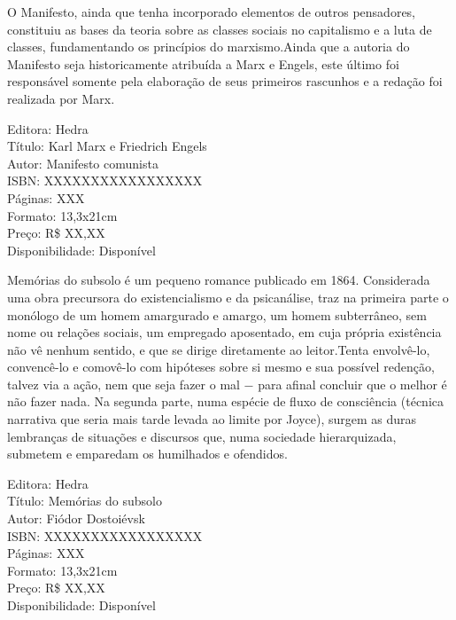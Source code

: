 O Manifesto, ainda que tenha incorporado elementos de outros pensadores, constituiu as bases da teoria sobre as classes sociais no capitalismo e a luta de classes, fundamentando os princípios do marxismo.Ainda que a autoria do Manifesto seja historicamente atribuída a Marx e Engels, este último foi responsável somente pela elaboração de seus primeiros rascunhos e a redação foi realizada por Marx.

\begin{ficha}
Editora: Hedra\\
Título: Karl Marx e Friedrich Engels\\
Autor: Manifesto comunista\\ 
ISBN: XXXXXXXXXXXXXXXXX\\
Páginas: XXX\\
Formato: 13,3x21cm\\
Preço: R\$ XX,XX\\
Disponibilidade: Disponível
\end{ficha}

\pagebreak


\noindent{}Memórias do subsolo é um pequeno romance publicado em 1864. Considerada uma obra precursora do existencialismo e da psicanálise, traz na primeira parte o monólogo de um homem amargurado e amargo, um homem subterrâneo, sem nome ou relações sociais, um empregado aposentado, em cuja própria existência não vê nenhum sentido, e que se dirige diretamente ao leitor.Tenta envolvê-lo, convencê-lo e comovê-lo com hipóteses sobre si mesmo e sua possível redenção, talvez via a ação, nem que seja fazer o mal − para afinal concluir que o melhor é não fazer nada. Na segunda parte, numa espécie de fluxo de consciência (técnica narrativa que seria mais tarde levada ao limite por Joyce), surgem as duras lembranças de situações e discursos que, numa sociedade hierarquizada, submetem e emparedam os humilhados e ofendidos.


\begin{ficha}
Editora: Hedra\\
Título: Memórias do subsolo\\
Autor: Fiódor Dostoiévsk\\ 
ISBN: XXXXXXXXXXXXXXXXX\\
Páginas: XXX\\
Formato: 13,3x21cm\\
Preço: R\$ XX,XX\\
Disponibilidade: Disponível
\end{ficha}

